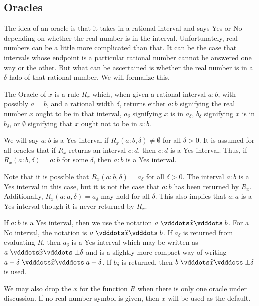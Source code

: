 \documentclass[12pt]{article}
\begin{document}
\subsection{Oracles}


The idea of an oracle is that it takes in a rational interval and says Yes or No depending on whether the real number is in the interval. Unfortunately, real numbers can be a little more complicated than that. It can be the case that intervals whose endpoint is a particular rational number cannot be answered one way or the other. But what can be ascertained is whether the real number is in a $\delta$-halo of that rational number. We will formalize this. 

The Oracle of $x$ is a rule $R_x$ which, when given a rational interval $a:b$, with possibly $a=b$, and a rational width $\delta$, returns either $a:b$ signifying the real number $x$ ought to be in that interval,  $a_\delta$ signifying $x$ is in $a_\delta$, $b_\delta$ signifying $x$ is in $b_\delta$, or $\emptyset$ signifying that $x$ ought not to be in $a:b$.

We will say $a:b$ is a Yes interval if $R_x (a:b, \delta) \neq \emptyset$ for all $\delta >0$. It is assumed for all oracles that if $R_x$ returns an interval $c:d$, then $c:d$ is a Yes interval. Thus, if $R_x( a:b, \delta) = a:b$ for some $\delta$, then $a:b$ is a Yes interval. 

Note that it is possible that $R_x(a:b, \delta) = a_\delta$ for all $\delta > 0$. The interval $a:b$ is a Yes interval in this case, but it is not the case that $a:b$ has been returned by $R_x$. Additionally, $R_x(a:a, \delta) = a_\delta$ may hold for all $\delta$. This also implies that $a:a$ is a Yes interval though it is never returned by $R_x$.

If $a:b$ is a Yes interval, then we use the notation $a \xora b$. For a No interval, the notation is \sout{$a \xora b$}. If $a_\delta$ is returned from evaluating $R$, then $a_\delta$ is a Yes interval which may be written as $a \xora \pm \delta$ and is a slightly more compact way of writing $a-\delta \xora a + \delta$. If $b_\delta$ is returned, then $b \xora \pm \delta$ is used. 

We  may also drop the $x$ for the function $R$ when there is only one oracle under discussion. If no real number symbol is given, then $x$ will be used as the default. 
\end{document}
